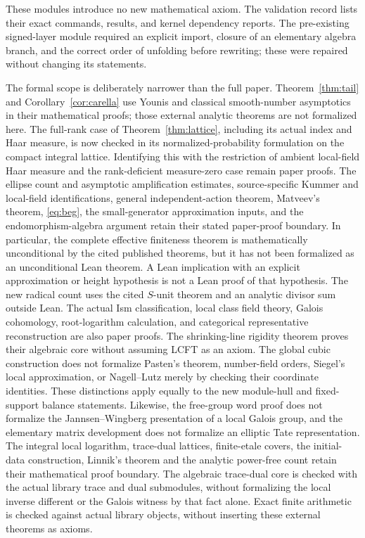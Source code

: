\documentclass[11pt]{amsart}
\theoremstyle{definition}
\theoremstyle{remark}
\begin{document}
These modules introduce no new mathematical axiom. The validation record
lists their exact commands, results, and kernel dependency reports.
The pre-existing signed-layer module required an explicit import, closure
of an elementary algebra branch, and the correct order of unfolding before
rewriting; these were repaired without changing its statements.

The formal scope is deliberately narrower than the full paper.
Theorem~\ref{thm:tail} and Corollary~\ref{cor:carella} use Younis and classical
smooth-number asymptotics in their mathematical proofs; those external
analytic theorems are not formalized here. The full-rank case of
Theorem~\ref{thm:lattice}, including its actual index and Haar measure,
is now checked in its normalized-probability formulation on the compact
integral lattice. Identifying this with the restriction of ambient
local-field Haar measure and the rank-deficient measure-zero case remain
paper proofs. The ellipse count and asymptotic amplification estimates,
source-specific Kummer and local-field identifications, general
independent-action theorem, Matveev's theorem, \eqref{eq:beg}, the
small-generator approximation inputs, and the endomorphism-algebra
argument retain their stated paper-proof boundary. In particular, the
complete effective finiteness theorem is mathematically unconditional
by the cited published theorems, but it has not been formalized as an
unconditional Lean theorem. A Lean implication with an explicit
approximation or height hypothesis is not a Lean proof of that hypothesis.
The new radical count uses the cited $S$-unit theorem and an analytic
divisor sum outside Lean. The actual Ism classification, local class field
theory, Galois cohomology, root-logarithm calculation, and categorical
representative reconstruction are also paper proofs. The shrinking-line
rigidity theorem proves their algebraic core without assuming LCFT as an
axiom. The global cubic construction does not formalize Pasten's theorem,
number-field orders, Siegel's local approximation, or Nagell--Lutz merely
by checking their coordinate identities. These distinctions apply equally
to the new module-hull and fixed-support balance statements.
Likewise, the free-group word proof does not formalize the
Jannsen--Wingberg presentation of a local Galois group, and the elementary
matrix development does not formalize an elliptic Tate representation.
The integral local logarithm, trace-dual lattices, finite-etale covers,
the initial-data construction, Linnik's theorem and the analytic
power-free count retain their mathematical proof boundary. The algebraic
trace-dual core is checked with the actual library trace and dual
submodules, without formalizing the local inverse different or the
Galois witness by that fact alone. Exact finite
arithmetic is checked against actual library objects, without inserting
these external theorems as axioms.
\end{document}
